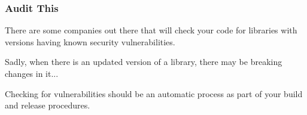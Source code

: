 \begin{frame}
\frametitle{Audit This}

There are some companies out there that will check your code for libraries with versions having known security vulnerabilities.

Sadly, when there is an updated version of a library, there may be breaking changes in it...

Checking for vulnerabilities should be an automatic process as part of your build and release procedures. 

\end{frame}




